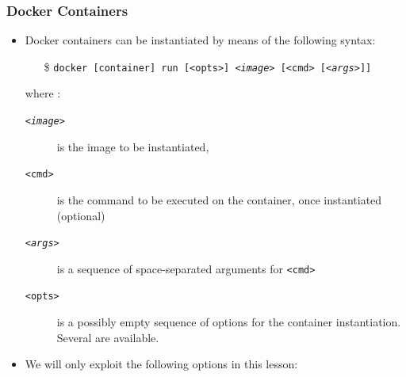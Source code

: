 \documentclass[presentation]{beamer}\mode<presentation>{\usetheme{AMSBolognaFC}}
\begin{document}
\begin{frame}[allowframebreaks]
\frametitle{Docker Containers}

\begin{itemize}
    \item Docker containers can be instantiated by means of the following syntax:
    \begin{itemize}
        \item[\$] \texttt{docker [container] \alert{run} [\alert{<opts>}] \alert{\textit{<image>}} [\alert{<cmd>} [\textit{\alert{<args>}}]]}
    \end{itemize}
    where :
    \begin{description}
        \item[\texttt{\textit{<image>}}] is the image to be instantiated,
        \item[\texttt{<cmd>}] is the command to be executed on the container, once instantiated (optional)
        \item[\texttt{\textit{<args>}}] is a sequence of space-separated arguments for \texttt{<cmd>}
        \item[\texttt{<opts>}] is a possibly empty sequence of options for the container instantiation. Several are available.
    \end{description}

    \framebreak

    \item We will only exploit the following options in this lesson:
\end{itemize}
\end{frame}
\end{document}
